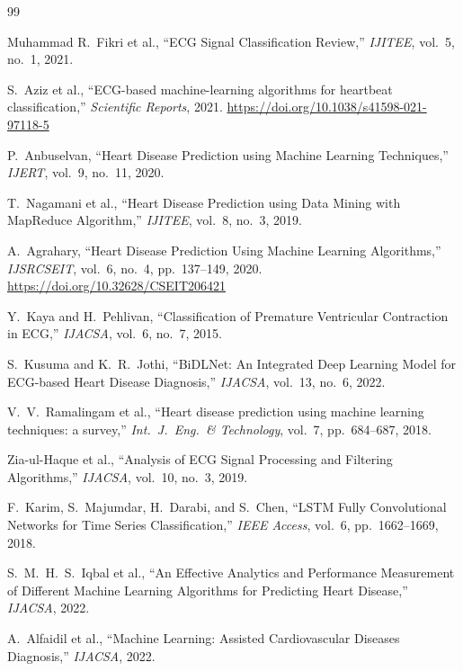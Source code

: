 \documentclass[10pt, twocolumn]{article}
\begin{document}
\begin{thebibliography}{99}

Muhammad R.\ Fikri et al.,
``ECG Signal Classification Review,''
\textit{IJITEE}, vol.~5, no.~1, 2021.

S.\ Aziz et al.,
``ECG-based machine-learning algorithms for heartbeat classification,''
\textit{Scientific Reports}, 2021.
\url{https://doi.org/10.1038/s41598-021-97118-5}

P.\ Anbuselvan,
``Heart Disease Prediction using Machine Learning Techniques,''
\textit{IJERT}, vol.~9, no.~11, 2020.

T.\ Nagamani et al.,
``Heart Disease Prediction using Data Mining with MapReduce Algorithm,''
\textit{IJITEE}, vol.~8, no.~3, 2019.

A.\ Agrahary,
``Heart Disease Prediction Using Machine Learning Algorithms,''
\textit{IJSRCSEIT}, vol.~6, no.~4, pp.~137--149, 2020.
\url{https://doi.org/10.32628/CSEIT206421}

Y.\ Kaya and H.\ Pehlivan,
``Classification of Premature Ventricular Contraction in ECG,''
\textit{IJACSA}, vol.~6, no.~7, 2015.

S.\ Kusuma and K.\ R.\ Jothi,
``BiDLNet: An Integrated Deep Learning Model for ECG-based Heart Disease Diagnosis,''
\textit{IJACSA}, vol.~13, no.~6, 2022.

V.\ V.\ Ramalingam et al.,
``Heart disease prediction using machine learning techniques: a survey,''
\textit{Int.\ J.\ Eng.\ \& Technology}, vol.~7, pp.~684--687, 2018.

Zia-ul-Haque et al.,
``Analysis of ECG Signal Processing and Filtering Algorithms,''
\textit{IJACSA}, vol.~10, no.~3, 2019.

F.\ Karim, S.\ Majumdar, H.\ Darabi, and S.\ Chen,
``LSTM Fully Convolutional Networks for Time Series Classification,''
\textit{IEEE Access}, vol.~6, pp.~1662--1669, 2018.

S.\ M.\ H.\ S.\ Iqbal et al.,
``An Effective Analytics and Performance Measurement of Different Machine Learning Algorithms
for Predicting Heart Disease,''
\textit{IJACSA}, 2022.

A.\ Alfaidil et al.,
``Machine Learning: Assisted Cardiovascular Diseases Diagnosis,''
\textit{IJACSA}, 2022.


\end{thebibliography}
\end{document}
